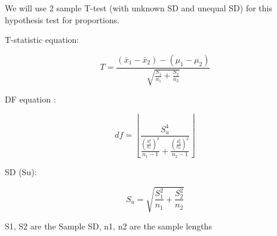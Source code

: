 \documentclass[11pt]{article}
\begin{document}
We will use 2 sample T-test (with unknown SD and unequal SD) for this
hypothesis test for proportions.

T-statistic equation:

\begin{equation*} T = \frac{(\bar x_1 - \bar x_2) - (\mu _1 - \mu _2)} {\sqrt {\frac {S_1}{n_1} + \frac {S_2} {n_2}}} \end{equation*}

DF equation :

\begin{equation*} df = \left \lfloor{\frac{S_u ^ 4} {\frac{( \frac{S_1 ^ 2}{n_1} )^2}{n_1 - 1} + {\frac{( \frac{S_2 ^ 2}{n_2} )^2}{n_2 - 1}}}} \right \rfloor\end{equation*}

SD (Su):

\begin{equation*} S_u = \sqrt{\frac{S_1 ^ 2}{n_1} + \frac{S_2 ^ 2}{n_2}}  \end{equation*}

S1, S2 are the Sample SD, n1, n2 are the sample lengths
\end{document}
